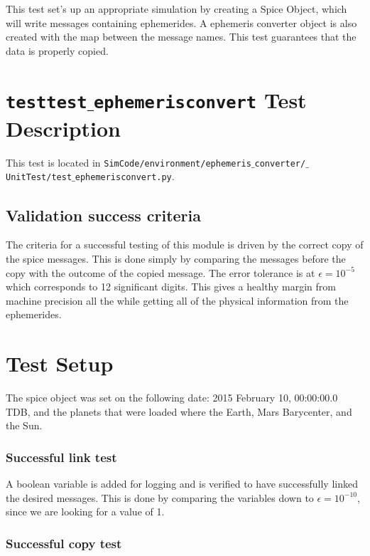 \documentclass[]{BasiliskReportMemo}
\begin{document}
This test set's up an appropriate simulation by creating a Spice Object, which will write messages containing ephemerides. A ephemeris converter object is also created with the map between the message names. This test guarantees that the data is properly copied.


\section{{\tt test\textunderscore test$\_$ephemerisconvert} Test Description}

This test is located in {\tt SimCode/environment/ephemeris$\_$converter/$\_$UnitTest/test$\_$ephemerisconvert.py}. \par

\subsection{Validation success criteria }

The criteria for a successful testing of this module is driven by the correct copy of the spice messages. This is done simply by comparing the messages before the copy with the outcome of the copied message. The error tolerance is at $\epsilon =10^{-5}$ which corresponds to 12 significant digits. This gives a healthy margin from machine precision all the while getting all of the physical information from the ephemerides. 

\section{Test Setup}

The spice object was set on the following date: 2015 February 10, 00:00:00.0 TDB, and the planets that were loaded where the Earth, Mars Barycenter, and the Sun.

\subsubsection*{Successful link test}

A boolean variable is added for logging and is verified to have successfully linked the desired messages. This is done by comparing the variables down to $\epsilon =10^{-10}$, since we are looking for a value of 1.

\subsubsection*{Successful copy test}
\end{document}
